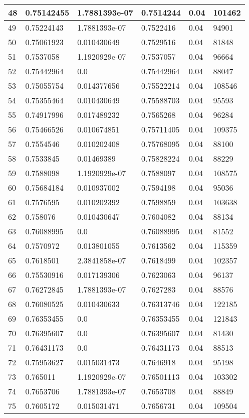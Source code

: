 \begin{longtable}{|l|l|l|l|l|l|}
48 & 0.75142455 & 1.7881393e-07 & 0.7514244 & 0.04 & 101462 \\ \hline 
49 & 0.75224143 & 1.7881393e-07 & 0.7522416 & 0.04 & 94901 \\ \hline 
50 & 0.75061923 & 0.010430649 & 0.7529516 & 0.04 & 81848 \\ \hline 
51 & 0.7537058 & 1.1920929e-07 & 0.7537057 & 0.04 & 96664 \\ \hline 
52 & 0.75442964 & 0.0 & 0.75442964 & 0.04 & 88047 \\ \hline 
53 & 0.75055754 & 0.014377656 & 0.75522214 & 0.04 & 108546 \\ \hline 
54 & 0.75355464 & 0.010430649 & 0.75588703 & 0.04 & 95593 \\ \hline 
55 & 0.74917996 & 0.017489232 & 0.7565268 & 0.04 & 96284 \\ \hline 
56 & 0.75466526 & 0.010674851 & 0.75711405 & 0.04 & 109375 \\ \hline 
57 & 0.7554546 & 0.010202408 & 0.75768095 & 0.04 & 88100 \\ \hline 
58 & 0.7533845 & 0.01469389 & 0.75828224 & 0.04 & 88229 \\ \hline 
59 & 0.7588098 & 1.1920929e-07 & 0.7588097 & 0.04 & 108575 \\ \hline 
60 & 0.75684184 & 0.010937002 & 0.7594198 & 0.04 & 95036 \\ \hline 
61 & 0.7576595 & 0.010202392 & 0.7598859 & 0.04 & 103638 \\ \hline 
62 & 0.758076 & 0.010430647 & 0.7604082 & 0.04 & 88134 \\ \hline 
63 & 0.76088995 & 0.0 & 0.76088995 & 0.04 & 81552 \\ \hline 
64 & 0.7570972 & 0.013801055 & 0.7613562 & 0.04 & 115359 \\ \hline 
65 & 0.7618501 & 2.3841858e-07 & 0.7618499 & 0.04 & 102357 \\ \hline 
66 & 0.75530916 & 0.017139306 & 0.7623063 & 0.04 & 96137 \\ \hline 
67 & 0.76272845 & 1.7881393e-07 & 0.7627283 & 0.04 & 88576 \\ \hline 
68 & 0.76080525 & 0.010430633 & 0.76313746 & 0.04 & 122185 \\ \hline 
69 & 0.76353455 & 0.0 & 0.76353455 & 0.04 & 121843 \\ \hline 
70 & 0.76395607 & 0.0 & 0.76395607 & 0.04 & 81430 \\ \hline 
71 & 0.76431173 & 0.0 & 0.76431173 & 0.04 & 88513 \\ \hline 
72 & 0.75953627 & 0.015031473 & 0.7646918 & 0.04 & 95198 \\ \hline 
73 & 0.765011 & 1.1920929e-07 & 0.76501113 & 0.04 & 103302 \\ \hline 
74 & 0.7653706 & 1.7881393e-07 & 0.7653708 & 0.04 & 88849 \\ \hline 
75 & 0.7605172 & 0.015031471 & 0.7656731 & 0.04 & 109504 \\ \hline 
\end{longtable}